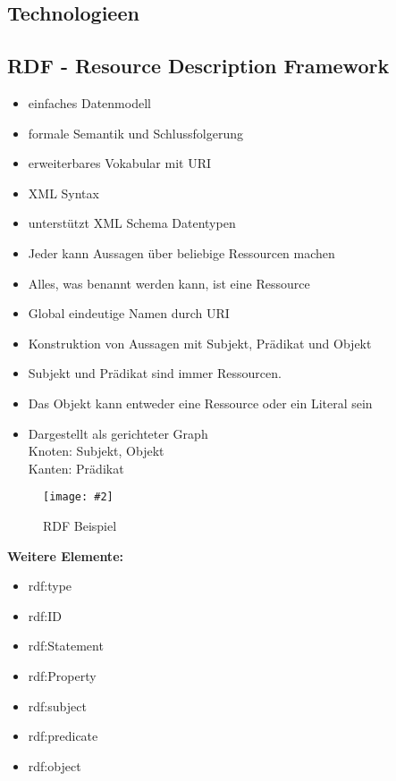 \documentclass[a4paper,10pt,titlepage=false]{scrreprt}
\newcommand{\pic}[2][figure]{\begin{figure}[h]
 \centering
 \texttt{[image: \#2]}
 \caption{#1}
\end{figure}
}
\begin{document}
\begin{itemize}

\section{Technologieen} %
\label{sec:technologieen}

\subsection{RDF - Resource Description Framework} %
\label{sub:rdf_resource_description_framework}
\begin{itemize}
  \item einfaches Datenmodell
\item formale Semantik und Schlussfolgerung
\item erweiterbares Vokabular mit URI
\item XML Syntax
\item unterstützt XML Schema Datentypen
\item Jeder kann Aussagen über beliebige Ressourcen
machen
\item Alles, was benannt werden kann, ist eine Ressource
\item Global eindeutige Namen durch URI
\item Konstruktion von Aussagen mit Subjekt, Prädikat und
Objekt
\item Subjekt und Prädikat sind immer Ressourcen.
\item Das Objekt kann entweder eine Ressource oder ein
Literal sein
\item Dargestellt als gerichteter Graph\\
Knoten: Subjekt, Objekt\\
Kanten: Prädikat\\

\end{itemize}
\pic[RDF Beispiel]{rdf.png}

\textbf{Weitere Elemente:}
\begin{itemize}
  \item rdf:type
\item rdf:ID
\item rdf:Statement
\item rdf:Property
\item rdf:subject
\item rdf:predicate
\item rdf:object
\end{itemize}

\end{itemize}
\end{document}
